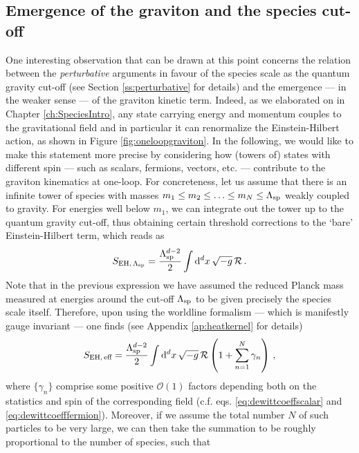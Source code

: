 \subsection{Emergence of the graviton and the species cut-off}
\label{ss:Emergencegraviton}

One interesting observation that can be drawn at this point concerns the relation between the \emph{perturbative} arguments in favour of the species scale as the quantum gravity cut-off (see Section \ref{ss:perturbative} for details) and the emergence --- in the weaker sense --- of the graviton kinetic term. Indeed, as we elaborated on in Chapter \ref{ch:SpeciesIntro}, any state carrying energy and momentum couples to the gravitational field and in particular it can renormalize the Einstein-Hilbert action, as shown in Figure \ref{fig:oneloopgraviton}. In the following, we would like to make this statement more precise by considering how (towers of) states with different spin --- such as scalars, fermions, vectors, etc. --- contribute to the graviton kinematics at one-loop. For concreteness, let us assume that there is an infinite tower of species with masses $m_1 \leq m_2 \leq \ldots \leq m_N \leq \Lambda_{\text{sp}}$ weakly coupled to gravity. For energies well below $m_1$, we can integrate out the tower up to the quantum gravity cut-off, thus obtaining certain threshold corrections to the `bare' Einstein-Hilbert term, which reads as
%
\begin{equation}\label{eq:EH}
	S_{\text{EH},\, \Lambda_{\text{sp}}} = \frac{\Lambda_{\text{sp}}^{d-2}}{2} \int {\rm d}^{d}x\, \sqrt{-g}\,  \mathcal{R}\, .
\end{equation}
%
Note that in the previous expression we have assumed the reduced Planck mass measured at energies around the cut-off $\Lambda_{\text{sp}}$ to be given precisely the species scale itself. Therefore, upon using the worldline formalism\cite{Schubert:2001he, Vassilevich:2003xt, Bastianelli:2008cu,Bastianelli:2005rc} --- which is manifestly gauge invariant --- one finds (see Appendix \ref{ap:heatkernel} for details)
%
\begin{equation}\label{eq:quantumEH}
	S_{\text{EH},\, \text{eff}} = \frac{\Lambda_{\text{sp}}^{d-2}}{2} \int {\rm d}^{d}x\, \sqrt{-g}\,  \mathcal{R} \left( 1+\sum_{n=1}^N \gamma_n \right)\, ,
\end{equation}
%
where $\{\gamma_n\}$ comprise some positive $\mathcal{O}(1)$ factors depending both on the statistics and spin of the corresponding field (c.f. eqs. \eqref{eq:dewittcoeffscalar} and \eqref{eq:dewittcoefffermion}). Moreover, if we assume the total number $N$ of such particles to be very large, we can then take the summation to be roughly proportional to the number of species, such that
